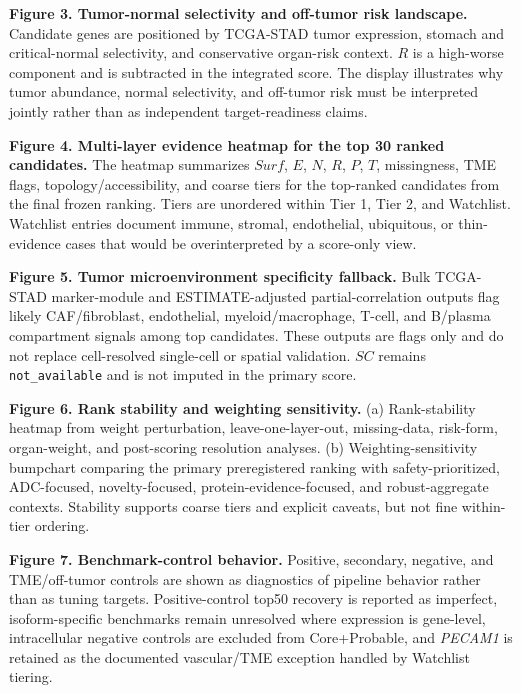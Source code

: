 \documentclass[twocolumn]{article}
\begin{document}
\textbf{Figure 3. Tumor-normal selectivity and off-tumor risk landscape.} Candidate genes are positioned by TCGA-STAD tumor expression, stomach and critical-normal selectivity, and conservative organ-risk context. $R$ is a high-worse component and is subtracted in the integrated score. The display illustrates why tumor abundance, normal selectivity, and off-tumor risk must be interpreted jointly rather than as independent target-readiness claims.

\textbf{Figure 4. Multi-layer evidence heatmap for the top 30 ranked candidates.} The heatmap summarizes $Surf$, $E$, $N$, $R$, $P$, $T$, missingness, TME flags, topology/\allowbreak{}accessibility, and coarse tiers for the top-ranked candidates from the final frozen ranking. Tiers are unordered within Tier 1, Tier 2, and Watchlist. Watchlist entries document immune, stromal, endothelial, ubiquitous, or thin-evidence cases that would be overinterpreted by a score-only view.

\textbf{Figure 5. Tumor microenvironment specificity fallback.} Bulk TCGA-STAD marker-module and ESTIMATE-adjusted partial-correlation outputs flag likely CAF/\allowbreak{}fibroblast, endothelial, myeloid/\allowbreak{}macrophage, T-cell, and B/\allowbreak{}plasma compartment signals among top candidates. These outputs are flags only and do not replace cell-resolved single-cell or spatial validation. $SC$ remains \texttt{not\_available} and is not imputed in the primary score.

\textbf{Figure 6. Rank stability and weighting sensitivity.} (a) Rank-stability heatmap from weight perturbation, leave-one-layer-out, missing-data, risk-form, organ-weight, and post-scoring resolution analyses. (b) Weighting-sensitivity bumpchart comparing the primary preregistered ranking with safety-prioritized, ADC-focused, novelty-focused, protein-evidence-focused, and robust-aggregate contexts. Stability supports coarse tiers and explicit caveats, but not fine within-tier ordering.

\textbf{Figure 7. Benchmark-control behavior.} Positive, secondary, negative, and TME/\allowbreak{}off-tumor controls are shown as diagnostics of pipeline behavior rather than as tuning targets. Positive-control top50 recovery is reported as imperfect, isoform-specific benchmarks remain unresolved where expression is gene-level, intracellular negative controls are excluded from Core+\allowbreak{}Probable, and \textit{PECAM1} is retained as the documented vascular/\allowbreak{}TME exception handled by Watchlist tiering.
\end{document}
